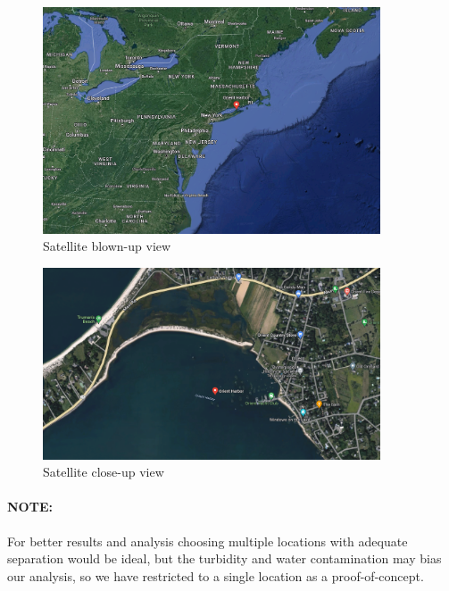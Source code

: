     \begin{figure}[H]
        \centering
        \includegraphics[width=10cm]{figs/RSS_SATELLITE_OBS.png}
        \caption{Satellite blown-up view}
    \end{figure}
    \begin{figure}[h]
        \centering        
        \includegraphics[width=10cm]{figs/RSS_OBS.png}
        \caption{Satellite close-up view}
    \end{figure}
    
    \paragraph{NOTE:}
    For better results and analysis choosing multiple locations with adequate separation would be ideal, but the turbidity and water contamination may bias our analysis, so we have restricted to a single location as a proof-of-concept.
